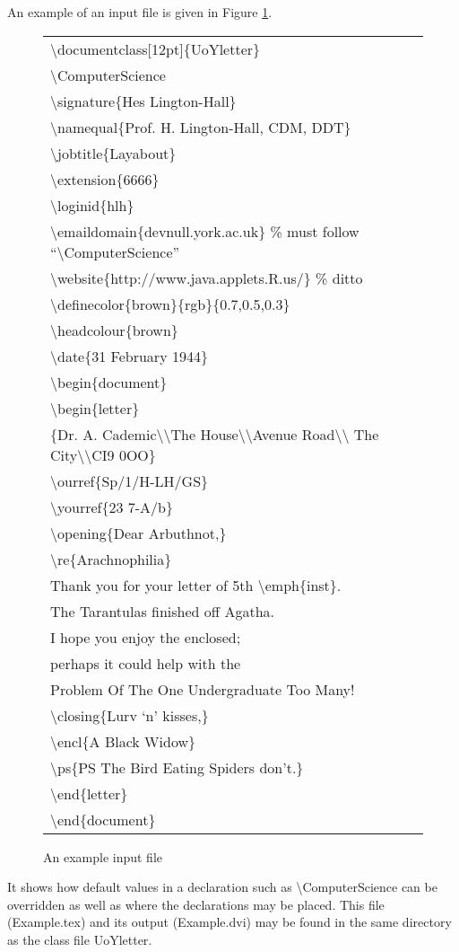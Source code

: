 \documentclass[12pt,a4paper]{article}
\newcommand{\cmdsty}[1]{\textsf{#1}}
\newcommand{\cmd}[1]{\cmdsty{\textbackslash#1}}
\newcommand{\pcmd}[2]{\cmdsty{\cmd{#1}$\{$#2$\}$}}
\newcommand{\nl}{\textbackslash\textbackslash}
\begin{document}
An example of an input file is given in Figure \ref{ExampleInput:Fig}.
\begin{figure}
{\sffamily
\begin{tabular}[t]{l}
\pcmd{documentclass[12pt]}{UoYletter}\\[1ex]
\cmd{ComputerScience}\\
\pcmd{signature}{Hes Lington-Hall}\\
\pcmd{namequal}{Prof. H. Lington-Hall, CDM, DDT}\\
\pcmd{jobtitle}{Layabout}\\
\pcmd{extension}{6666}\\
\pcmd{loginid}{hlh}\\
\pcmd{emaildomain}{devnull.york.ac.uk}
        \% must follow ``\cmd{ComputerScience}''\\
\pcmd{website}{http://www.java.applets.R.us/} \% ditto\\[1ex]
\pcmd{definecolor}{brown$\}\{$rgb$\}\{$0.7,0.5,0.3}\\
\pcmd{headcolour}{brown}\\[1ex]
\pcmd{date}{31 February 1944}\\[1ex]
\pcmd{begin}{document}\\
\pcmd{begin}{letter}\\
\hspace*{1cm}   $\{$Dr. A. Cademic\nl The House\nl Avenue Road\nl
                The City\nl CI9 0OO$\}$\\
\pcmd{ourref}{Sp/1/H-LH/GS}\\
\pcmd{yourref}{23 7-A/b}\\
\pcmd{opening}{Dear Arbuthnot,}\\
\pcmd{re}{Arachnophilia}\\
Thank you for your letter of 5th \pcmd{emph}{inst}.\\
The Tarantulas finished off Agatha.\\
I hope you enjoy the enclosed;\\
perhaps it could help with the\\
Problem Of The One Undergraduate Too Many!\\
\pcmd{closing}{Lurv `n' kisses,}\\
\pcmd{encl}{A Black Widow}\\
\pcmd{ps}{PS The Bird Eating Spiders don't.}\\
\pcmd{end}{letter}\\
\pcmd{end}{document}
\end{tabular}
}
\caption{An example input file}\label{ExampleInput:Fig}
\end{figure}
It shows how default values in a declaration such as
\cmd{ComputerScience} can be overridden as well as where the
declarations may be placed.  This file (\cmdsty{Example.tex}) and its
output (\cmdsty{Example.dvi}) may be found in the same directory as
the class file \cmdsty{UoYletter}.
\end{document}
